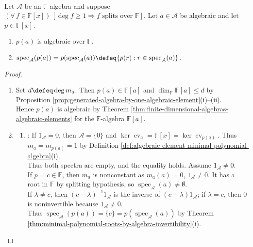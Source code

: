 \begin{theorem} \label{thm:algebra-polynomial-spectral-mapping} \\
Let $\mathcal{A}$ be an $\mathbb{F}$-algebra and suppose $(\forall\,f\in\mathbb{F}[x])\,[\deg f\geq1\Rightarrow f\text{ splits over }\mathbb{F}]$. Let $a\in\mathcal{A}$ be algebraic and let $p\in\mathbb{F}[x]$.
\begin{enumerate}[label=(\roman*)]
\setlength{\itemsep}{0pt}
\item $p(a)$ is algebraic over $\mathbb{F}$.
\item $\operatorname{spec}_{\mathcal{A}}(p(a))=p(\operatorname{spec}_{\mathcal{A}}(a))\defeq\{p(r):r\in\operatorname{spec}_{\mathcal{A}}(a)\}$.
\end{enumerate}
\begin{proof}
\begin{enumerate}[label=(\roman*)]
\setlength{\itemsep}{0pt}
\item[$(i)$] Set $d\defeq\deg m_a$. Then $p(a)\in\mathbb{F}[a]$ and $\dim_{\mathbb{F}}\mathbb{F}[a]\leq d$ by Proposition \ref{prop:generated-algebra-by-one-algebraic-element}(i)--(ii).\\
Hence $p(a)$ is algebraic by Theorem \ref{thm:finite-dimensional-algebras-algebraic-elements} for the $\mathbb{F}$-algebra $\mathbb{F}[a]$.
\item[$(ii)$]
\begin{enumerate}[label=(\alph*)]
\setlength{\itemsep}{0pt}
\item {}: If $1_{\mathcal{A}}=0$, then $\mathcal{A}=\{0\}$ and $\ker\operatorname{ev}_a=\mathbb{F}[x]=\ker\operatorname{ev}_{p(a)}$. Thus $m_a=m_{p(a)}=1$ by Definition \ref{def:algebraic-element-minimal-polynomial-algebra}(i).\\
Thus both spectra are empty, and the equality holds. Assume $1_{\mathcal{A}}\neq0$.\\
If $p=c\in\mathbb{F}$, then $m_a$ is nonconstant as $m_a(a)=0$, $1_{\mathcal{A}}\neq0$. It has a root in $\mathbb{F}$ by splitting hypothesis, so $\operatorname{spec}_{\mathcal{A}}(a)\neq\emptyset$.\\
If $\lambda\neq c$, then $(c-\lambda)^{-1}1_{\mathcal{A}}$ is the inverse of $(c-\lambda)1_{\mathcal{A}}$; if $\lambda=c$, then $0$ is noninvertible because $1_{\mathcal{A}}\neq0$.\\
Thus $\operatorname{spec}_{\mathcal{A}}(p(a))=\{c\}=p(\operatorname{spec}_{\mathcal{A}}(a))$ by Theorem \ref{thm:minimal-polynomial-roots-by-algebra-invertibility}(i).

\end{enumerate}
\end{enumerate}
\end{proof}
\end{theorem}
